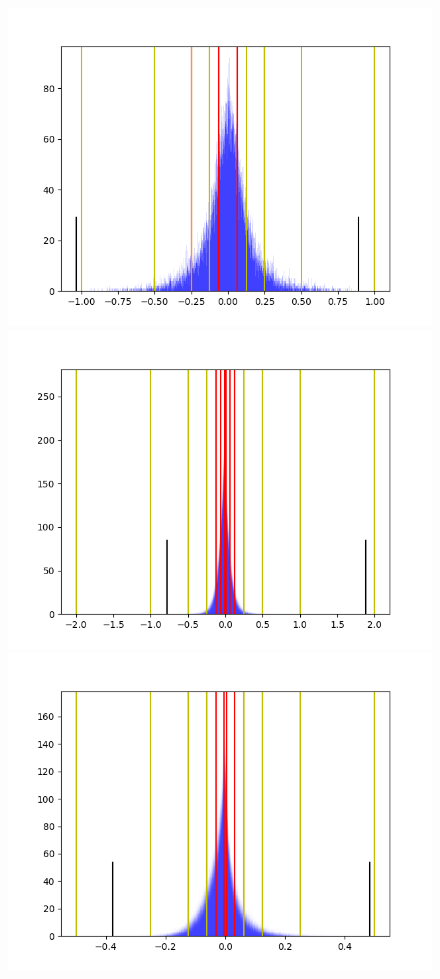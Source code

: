 \documentclass[ pdftex, oneside, master]{NJUthesis}
\begin{document}
\begin{figure}[ht]
\centering
\begin{minipage}[t]{0.3\textwidth}
\centering
\includegraphics[width=1\textwidth]{11.png}
\end{minipage}
\begin{minipage}[t]{0.3\textwidth}
\centering
\includegraphics[width=1\textwidth]{12.png}
\end{minipage}
\begin{minipage}[t]{0.3\textwidth}
\centering
\includegraphics[width=1\textwidth]{13.png}

\end{minipage}
\end{figure}
\end{document}
